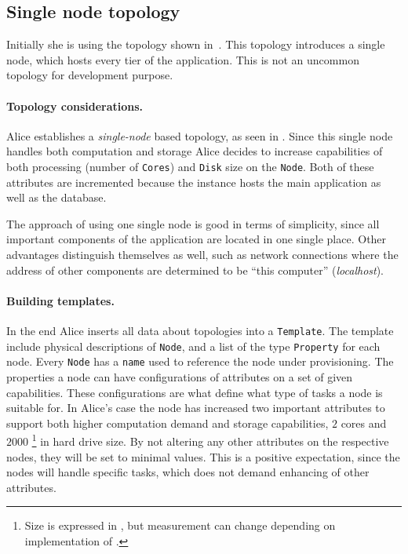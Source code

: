 \subsection{Single node topology}

Initially she is using the topology shown in~.
This topology introduces a single node, which hosts every tier of the application.
This is not an uncommon topology for development purpose.

\paragraph{Topology considerations.}

Alice establishes a \emph{single-node} based topology, as seen in .
Since this single node handles both computation and storage Alice decides to 
increase capabilities of both processing (number of \texttt{Cores}) and 
\texttt{Disk} size on the \texttt{Node}.
Both of these attributes are incremented because the instance hosts
the main application as well as the database.

The approach of using one single node is good in terms of simplicity,
since all important components of the application are located in one single place.
Other advantages distinguish themselves as well, such as network connections where
the address of other components are determined to be ``this computer'' (\emph{localhost}).

\paragraph{Building templates.}

In the end Alice inserts all data about topologies into a \texttt{Template}. 
The template include physical descriptions of \texttt{Node},
and a list of the type \texttt{Property} for each node.
Every \texttt{Node} has a \texttt{name} used to reference the node under provisioning.
The properties a node can have configurations of attributes on a set of given capabilities.
These configurations are what define what type of tasks a node is suitable for.
In Alice's case the node has increased two important attributes to support both higher computation 
demand and storage capabilities, \ie $2$ cores and $2000$ 
\footnote{
  Size is expressed in , but measurement can change depending on implementation of .
}
in hard drive size.
By not altering any other attributes on the respective nodes, they will be set to minimal values.
This is a positive expectation, since the nodes will handle specific tasks, which does not 
demand enhancing of other attributes.

